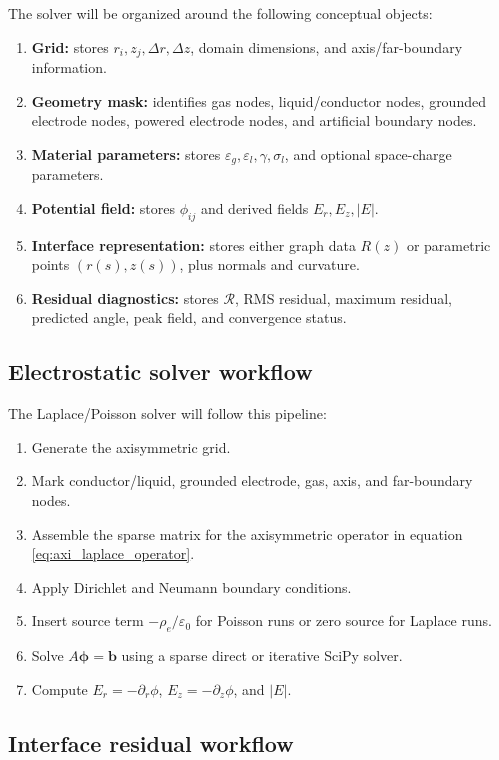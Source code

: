 \documentclass[11pt]{article}
\newcommand{\eps}{\varepsilon}
\newcommand{\abs}[1]{\left|#1\right|}
\begin{document}
The solver will be organized around the following conceptual objects:
\begin{enumerate}[label=\arabic*.]
    \item \textbf{Grid:} stores \(r_i,z_j,\Delta r,\Delta z\), domain dimensions, and axis/far-boundary information.
    \item \textbf{Geometry mask:} identifies gas nodes, liquid/conductor nodes, grounded electrode nodes, powered electrode nodes, and artificial boundary nodes.
    \item \textbf{Material parameters:} stores \(\eps_g,\eps_l,\gamma,\sigma_l\), and optional space-charge parameters.
    \item \textbf{Potential field:} stores \(\phi_{ij}\) and derived fields \(E_r,E_z,\abs{E}\).
    \item \textbf{Interface representation:} stores either graph data \(R(z)\) or parametric points \((r(s),z(s))\), plus normals and curvature.
    \item \textbf{Residual diagnostics:} stores \(\mathcal{R}\), RMS residual, maximum residual, predicted angle, peak field, and convergence status.
\end{enumerate}

\subsection{Electrostatic solver workflow}

The Laplace/Poisson solver will follow this pipeline:
\begin{enumerate}[label=\arabic*.]
    \item Generate the axisymmetric grid.
    \item Mark conductor/liquid, grounded electrode, gas, axis, and far-boundary nodes.
    \item Assemble the sparse matrix for the axisymmetric operator in equation \eqref{eq:axi_laplace_operator}.
    \item Apply Dirichlet and Neumann boundary conditions.
    \item Insert source term \(-\rho_e/\eps_0\) for Poisson runs or zero source for Laplace runs.
    \item Solve \(A\bm\phi=\bm b\) using a sparse direct or iterative SciPy solver.
    \item Compute \(E_r=-\partial_r\phi\), \(E_z=-\partial_z\phi\), and \(\abs{E}\).
\end{enumerate}

\subsection{Interface residual workflow}
\end{document}
